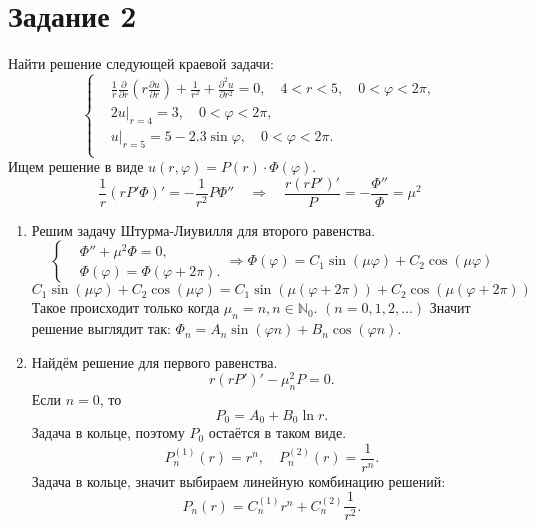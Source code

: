 \section*{Задание 2}
    Найти решение следующей краевой задачи: 
    \[
        \left\{\begin{split}
            & \frac{1}{r} \frac{\partial}{\partial r} \left( r \frac{\partial u}{\partial r} \right) + \frac{1}{r^2} + \frac{\partial^2 u}{\partial r^2} = 0, \quad 4 < r < 5, \quad 0 < \varphi < 2\pi, \\
            & 2u|_{r=4} = 3, \quad 0 < \varphi < 2\pi, \\
            & u|_{r=5} = 5 - 2.3 \sin \varphi, \quad 0 < \varphi < 2\pi. \\
        \end{split} \right.
    \]
    Ищем решение в виде \( u(r, \varphi) = P(r) \cdot \Phi(\varphi) \).
    \[
        \frac{1}{r} \left( r P' \Phi \right)' = - \frac{1}{r^2} P \Phi''
        \quad \Rightarrow \quad
        \frac{r\left(r P'\right)'}{P} = - \frac{\Phi''}{\Phi} = \mu^2
    \]
    \begin{enumerate}
        \item Решим задачу Штурма-Лиувилля для второго равенства.
        \[
            \left\{\begin{split}
                & \Phi'' + \mu^2 \Phi = 0, \\
                & \Phi(\varphi) = \Phi(\varphi + 2\pi).
            \end{split}\right.
            \Rightarrow
            \Phi(\varphi) = C_1 \sin (\mu \varphi) + C_2 \cos (\mu \varphi) 
        \]
        \[
            C_1 \sin (\mu \varphi) + C_2 \cos (\mu \varphi) = C_1 \sin \left(\mu (\varphi+2\pi)\right) + C_2 \cos \left(\mu (\varphi+2\pi)\right)
        \]
        Такое происходит только когда \( \mu_n = n, n \in \mathbb{N}_0 \). \( (n = 0,1,2,\dots) \) Значит решение выглядит так:
        \(
            \Phi_n = A_n \sin (\varphi n) + B_n \cos (\varphi n)
        \).
        \item Найдём решение для первого равенства.
        \[
            r\left( r P' \right)' - \mu_n^2 P = 0.
        \]
        Если \( n = 0 \), то 
        \[
            P_0 = A_0 + B_0 \ln r.
        \]
        Задача в кольце, поэтому \(P_0\) остаётся в таком виде.
        \[
            P_n^{(1)}(r) = r^n, \quad P_n^{(2)}(r) = \frac{1}{r^n}.
        \]
        Задача в кольце, значит выбираем линейную комбинацию решений:
        \[ P_n(r) = C_n^{(1)} r^n + C_n^{(2)} \frac{1}{r^2}. \]
    \end{enumerate}

